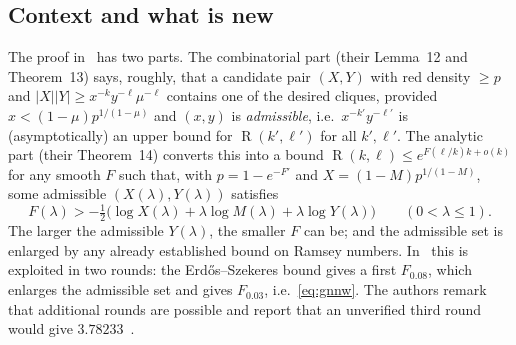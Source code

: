 \documentclass[11pt]{article}
\theoremstyle{definition}
\newcommand{\lam}{\lambda}
\DeclareMathOperator{\Ram}{R}
\begin{document}
\subsection*{Context and what is new}
The proof in~\cite{GNNW} has two parts.  The combinatorial part (their Lemma~12 and Theorem~13) says, roughly, that a candidate pair $(X,Y)$ with red density $\ge p$ and $|X||Y|\ge x^{-k}y^{-\ell}\mu^{-\ell}$ contains one of the desired cliques, provided $x<(1-\mu)p^{1/(1-\mu)}$ and $(x,y)$ is \emph{admissible}, i.e.\ $x^{-k'}y^{-\ell'}$ is (asymptotically) an upper bound for $\Ram(k',\ell')$ for all $k',\ell'$.  The analytic part (their Theorem~14) converts this into a bound $\Ram(k,\ell)\le e^{F(\ell/k)k+o(k)}$ for any smooth $F$ such that, with $p=1-e^{-F'}$ and $X=(1-M)p^{1/(1-M)}$, some admissible $(X(\lam),Y(\lam))$ satisfies
\begin{equation}\label{eq:mainineq}
F(\lam)>-\tfrac12\bigl(\log X(\lam)+\lam\log M(\lam)+\lam\log Y(\lam)\bigr)\qquad(0<\lam\le1).
\end{equation}
The larger the admissible $Y(\lam)$, the smaller $F$ can be; and the admissible set is enlarged by any already established bound on Ramsey numbers.  In~\cite{GNNW} this is exploited in two rounds: the Erd\H{o}s--Szekeres bound gives a first $F_{0.08}$, which enlarges the admissible set and gives $F_{0.03}$, i.e.\ \eqref{eq:gnnw}.  The authors remark that additional rounds are possible and report that an unverified third round would give $3.78233$~\cite[Remark~17]{GNNW}.
\end{document}
